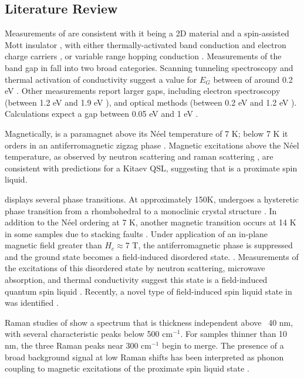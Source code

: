 \documentclass[11pt]{article}
\begin{document}
\begin{multicols}{2}
\section{Literature Review}
Measurements of \rucl are consistent with it being a 2D material \cite{Kim2015a} and a spin-assisted Mott insulator \cite{Plumb2014}, with either thermally-activated band conduction and electron charge carriers \cite{Rojas1983}, or variable range hopping conduction \cite{Mashhadi2018}. Measurements of the band gap in \rucl fall into two broad categories. Scanning tunneling spectroscopy and thermal activation of conductivity suggest a value for $E_{G}$ between of around 0.2 eV \cite{Binotto1971,Rojas1983,Ziatdinov2016}. Other measurements report larger gaps, including electron spectroscopy (between 1.2 eV and 1.9 eV \cite{Koitzsch2016,Zhou2016,Sinn2016}), and optical methods (between 0.2 eV and 1.2 eV \cite{Reschke2017,Pollini1996,Sandilands2016}). Calculations expect a gap between 0.05 eV and 1 eV  \cite{Sarikurt2017,Kim2015}.

Magnetically, \rucl is a paramagnet above its N{\'e}el temperature of 7 K; below 7 K it orders in an antiferromagnetic zigzag phase \cite{Sears2015}. Magnetic excitations above the N{\'e}el temperature, as observed by neutron scattering and raman scattering \cite{Banerjee2016,Sandilands2015}, are consistent with predictions for a Kitaev QSL, suggesting that \rucl is a proximate spin liquid.

\rucl displays several phase transitions. At approximately 150K, \rucl  undergoes a hysteretic phase transition from a rhombohedral to a monoclinic crystal structure \cite{Kubota2015,Ziatdinov2016,Glamazda2017,Reschke2017}. In addition to the N{\'e}el ordering at 7 K, another magnetic transition occurs at 14 K in some samples due to stacking faults \cite{Banerjee2016}. Under application of an in-plane magnetic field greater than $H_{c} \approx 7$ T, the antiferromagnetic phase is suppressed and the ground state becomes a field-induced disordered state. \cite{Hentrich2017,Wolter2017,Banerjee2017,Wang2017,Baek2017}. Measurements of the excitations of this disordered state by neutron scattering, microwave absorption, and thermal conductivity suggest this state is a field-induced quantum spin liquid \cite{Banerjee2016,Wellm2017,Kasahara2018}. Recently, a novel type of field-induced spin liquid state in \rucl was identified \cite{Lampen-Kelley2018}.

Raman studies of \rucl show a spectrum that is thickness independent above ~40 nm, with several characteristic peaks below 500 cm$^{-1}$. For samples thinner than 10 nm, the three Raman peaks near 300 cm$^{-1}$ begin to merge. The presence of a broad background signal at low Raman shifts has been interpreted as phonon coupling to magnetic excitations of the proximate spin liquid state \cite{Zhou2018,Du2019}.


\end{multicols}
\end{document}
